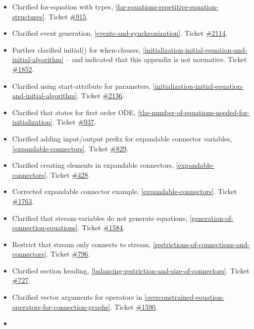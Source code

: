 \begin{itemize}
\item
  Clarified for-equation with types, \ref{for-equations-repetitive-equation-structures}. Ticket
  \href{https://trac.modelica.org/Modelica/ticket/915}{\#915}.
\item
  Clarified event generation, \ref{events-and-synchronization}. Ticket
  \href{https://trac.modelica.org/Modelica/ticket/2114}{\#2114}.
\item
  Further clarified initial() for when-clauses, \ref{initialization-initial-equation-and-initial-algorithm} -- and
  indicated that this appendix is not normative. Ticket
  \href{https://trac.modelica.org/Modelica/ticket/1852}{\#1852}.
\item
  Clarified using start-attribute for parameters, \ref{initialization-initial-equation-and-initial-algorithm}. Ticket
  \href{https://trac.modelica.org/Modelica/ticket/2136}{\#2136}.
\item
  Clarified that states for first order ODE, \ref{the-number-of-equations-needed-for-initialization}. Ticket
  \href{https://trac.modelica.org/Modelica/ticket/937}{\#937}.
\item
  Clarified adding input/output prefix for expandable connector
  variables, \ref{expandable-connectors}. Ticket
  \href{https://trac.modelica.org/Modelica/ticket/829}{\#829}.
\item
  Clarified creating elements in expandable connectors, \ref{expandable-connectors}.
  Ticket \href{https://trac.modelica.org/Modelica/ticket/428}{\#428}.
\item
  Corrected expandable connector example, \ref{expandable-connectors}. Ticket
  \href{https://trac.modelica.org/Modelica/ticket/1763}{\#1763}.
\item
  Clarified that stream-variables do not generate equations, \ref{generation-of-connection-equations}. Ticket
  \href{https://trac.modelica.org/Modelica/ticket/1584}{\#1584}.
\item
  Restrict that stream only connects to stream, \ref{restrictions-of-connections-and-connectors}. Ticket
  \href{https://trac.modelica.org/Modelica/ticket/796}{\#796}.
\item
  Clarified section heading, \ref{balancing-restriction-and-size-of-connectors}. Ticket
  \href{https://trac.modelica.org/Modelica/ticket/727}{\#727}.
\item
  Clarified vector arguments for operators in \ref{overconstrained-equation-operators-for-connection-graphs}. Ticket
  \href{https://trac.modelica.org/Modelica/ticket/1590}{\#1590}.
\item

\end{itemize}
